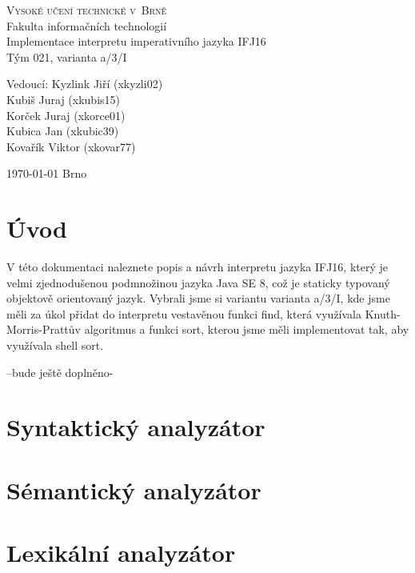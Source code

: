 \documentclass[a4paper,11pt]{article}
\begin{document}
\begin{center}
\Huge
\textsc{Vysoké učení technické v~Brně\\
}Fakulta informačních technologií\\
\LARGE Implementace interpretu imperativního jazyka IFJ16 \\
\Huge Tým 021, varianta a/3/I\\

\Large Vedoucí:	Kyzlink Jiří 	(xkyzli02)\\
				Kubiš Juraj		(xkubis15)\\
				Korček Juraj	(xkorce01)\\
				Kubica Jan		(xkubic39)\\
				Kovařík Viktor	(xkovar77)\\


\end{center}
{\Large \today \hfill
Brno}
\thispagestyle{empty}

\newpage

\tableofcontents

\newpage
\section{Úvod}
V této dokumentaci naleznete popis a návrh interpretu jazyka IFJ16, který je velmi zjednodušenou podmnožinou jazyka Java SE 8, což je staticky typovaný objektově orientovaný jazyk. Vybrali jsme si variantu varianta a/3/I, kde jsme měli za úkol přidat do interpretu vestavěnou funkci find, která využívala Knuth-Morris-Prattův algoritmus a funkci sort, kterou jsme měli implementovat tak, aby využívala shell sort.

--bude ještě doplněno-

\section{Syntaktický analyzátor}

\section{Sémantický analyzátor}

\section{Lexikální analyzátor}
\end{document}
